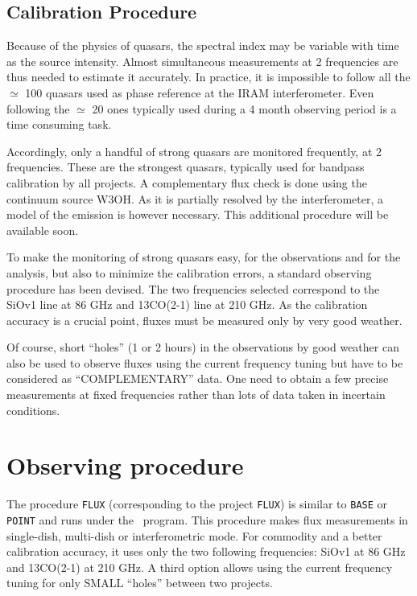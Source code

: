 \documentclass[11pt]{article}
\begin{document}
\subsection{Calibration Procedure}

Because of the physics of quasars, the spectral index may be variable with
time as the source intensity. Almost simultaneous measurements at 2
frequencies are thus needed to estimate it accurately. In practice, it is
impossible to follow all the $\simeq$ 100 quasars used as phase reference
at the IRAM interferometer. Even following the $\simeq$ 20 ones typically
used during a 4 month observing period is a time consuming task.

Accordingly, only a handful of strong quasars are monitored frequently, at
2 frequencies. These are the strongest quasars, typically used for bandpass
calibration by all projects. A complementary flux check is done using the
continuum source W3OH. As it is partially resolved by the interferometer, a
model of the emission is however necessary.  This additional procedure will
be available soon.


To make the monitoring of strong quasars easy, for the observations and for
the analysis, but also to minimize the calibration errors, a standard
observing procedure has been devised.  The two frequencies selected
correspond to the SiOv1 line at 86 GHz and 13CO(2-1) line at 210 GHz. As
the calibration accuracy is a crucial point, fluxes must be measured only
by very good weather.

Of course, short ``holes'' (1 or 2 hours) in the observations by good
weather can also be used to observe fluxes using the current frequency
tuning but have to be considered as ``COMPLEMENTARY'' data. One need to
obtain a few precise measurements at fixed frequencies rather than lots of
data taken in incertain conditions.

 
\section{Observing procedure}

The procedure {\tt FLUX} (corresponding to the project {\tt FLUX}) is
similar to {\tt BASE} or {\tt POINT} and runs under the \obs\ program.
This procedure makes flux measurements in single-dish, multi-dish or
interferometric mode. For commodity and a better calibration accuracy, it
uses only the two following frequencies: SiOv1 at 86 GHz and 13CO(2-1) at
210 GHz. A third option allows using the current frequency tuning for only
SMALL ``holes'' between two projects.
\end{document}
